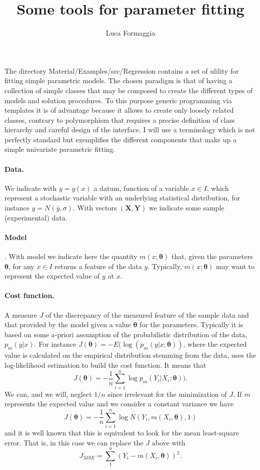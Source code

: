 \documentclass{article}
\author{Luca Formaggia}
\title{Some tools for parameter fitting}
\newcommand{\onlyprogramname}[1]{Material/Examples/src/#1}
\begin{document}
\maketitle

The directory \onlyprogramname{Regression} contains a set of ulility
for fitting simple parametric models.  The chosen paradigm is that of having a
collection of simple classes that may be composed to create the
different types of models and solution procedures.  To this purpose
generic programming via templates it is of advantage because it allows
to create only loosely related classes, contrary to polymorphism that
requires a precise definition of class hierarchy and careful design of
the interface.  I will use a terminology which is not perfectly
standard but exemplifies the different components that make up a
simple univariate parametric fitting.

\paragraph{\textbf{Data}.} We indicate with $y=y(x)$ a datum, function of a variable $x\in I$, which represent a stochastic variable with an underlying statistical
  distribution, for instance $y=N(\bar{y},\sigma)$. With vectors $(\mathbf{X},\mathbf{Y})$ we indicate some sample (experimental) data.
\paragraph{\textbf{Model}}. With model we indicate here the
  quantity $m(x;\boldsymbol{\theta})$ that, given the parameters $\boldsymbol{\theta}$, for any $x\in I$ returns a feature
  of the data $y$. Typically, $m(x;\boldsymbol{\theta})$ may want to
  represent the expected value of $y$ at $x$. 
\paragraph{\textbf{Cost function.}} A measure $J$ of the discrepancy of
  the measured feature of the sample data and that provided by the model
  given a value $\boldsymbol{\theta}$ for the parameters. Typically it is based on some a-priori
  assumption of the probabilistic distribution of the data, $p_m(y|x)$. For instance $J(\boldsymbol{\theta})=-E(\log(p_m(y|x;\boldsymbol{\theta}))$,
  where the expected value is calculated on the empirical distribution stemming
  from the data,
  uses the log-likelihood estimation to build the cost function. It means that
  \[
   J(\boldsymbol{\theta})=-\frac{1}{n}\sum_{i=1}^n \log p_m(Y_i|X_i;\boldsymbol{\theta})).
 \]
 We can, and we will, neglect $1/n$ since irrelevant for the minimization of $J$.
 If $m$ represents the expected value and we consider a constant variance we have
   \[
   J(\boldsymbol{\theta})=-\frac{1}{n}\sum_{i=1}^n \log N(Y_i,m(X_i,\boldsymbol{\theta}),1)
 \]
 and it is well known that this is equivalent to look for the mean least-square
 error. That is, in this case we can replace the $J$ above with
 \[
   J_{MSE}=\sum_1^n(Y_i-  m(X_i,\boldsymbol{\theta}))^2.
 \]
\end{document}
